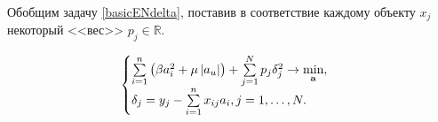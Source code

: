 Обобщим задачу \ref{basicENdelta}, поставив в соответствие каждому объекту $x_j$ некоторый <<вес>> $p_j\in \mathbb R$.

\begin{equation}
	\label{weighedENdelta}
	\begin{cases}
		\sum\limits_{i=1}^n\left(\beta a_i^2 + \mu \left|a_u\right|\right) 
	+ \sum\limits_{j=1}^N p_j\delta_j^2 \to \mathop{\mbox{min}}\limits_{\boldsymbol{\mathbf{a}}}, \\
	\delta_j = y_j - \sum\limits_{i=1}^nx_{ij}a_i, j=1,\ldots,N. 
	\end{cases}
\end{equation}